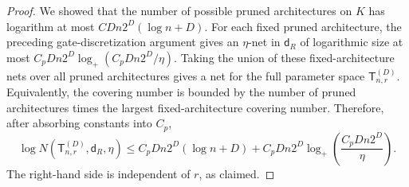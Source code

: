 \documentclass[10pt,a4paper]{amsart}
\begin{document}
\begin{proof}
We showed that the number of possible pruned architectures on \(K\) has logarithm at most $C Dn2^D(\log n+D)$. For each fixed pruned architecture, the preceding gate-discretization argument
gives an \(\eta\)-net in \(\mathsf{d}_{R}\) of logarithmic size at most $C_pDn2^D
    \log_+ (C_pDn2^D/\eta)$. Taking the union of these fixed-architecture nets over all pruned
architectures gives a net for the full parameter space \(\mathsf{T}_{n,r}^{(D)}\).
Equivalently, the covering number is bounded by the number of pruned
architectures times the largest fixed-architecture covering number. Therefore,
after absorbing constants into \(C_p\),
\[
\log N(\mathsf{T}_{n,r}^{(D)},\mathsf{d}_{R},\eta)
\le
C_pDn2^D(\log n+D)
+
C_pDn2^D
\log_+\left(\frac{C_pDn2^D}{\eta}\right).
\]
The right-hand side is independent of $r$, as claimed.

\end{proof}
\end{document}
